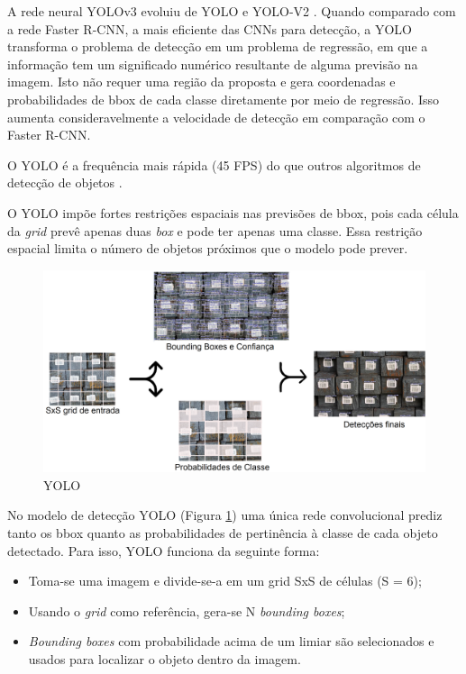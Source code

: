 A rede neural YOLOv3 evoluiu de YOLO e YOLO-V2 \cite{redmon2018yolov3}. Quando comparado com a rede Faster R-CNN, a mais eficiente das CNNs para detecção, a YOLO transforma o problema de detecção em um problema de regressão, em que a informação tem um significado numérico resultante de alguma previsão na imagem. Isto não requer uma região da proposta e gera coordenadas e probabilidades de bbox de cada classe diretamente por meio de regressão. Isso aumenta consideravelmente a velocidade de detecção em comparação com o Faster R-CNN.\cite{yolov3_apple}

O YOLO é a frequência mais rápida (45 FPS) do que outros algoritmos de detecção de objetos \cite{yolov3RealTime}.

O YOLO impõe fortes restrições espaciais nas previsões de bbox, pois cada célula da \textit{grid} prevê apenas duas \textit{box} e pode ter apenas uma classe. Essa restrição espacial limita o número de objetos próximos que o modelo pode prever. \cite{yolov3RealTime}

\begin{figure}[htbp]
		\centering
		\includegraphics[scale=0.2]{figuras/MachineLearning/yolo.png}
		\caption{YOLO}
		\label{fig:yolo}
\end{figure}

No modelo de detecção YOLO (Figura \ref{fig:yolo}) uma única rede convolucional prediz tanto os bbox quanto as probabilidades de pertinência à classe de cada objeto detectado. Para isso, YOLO funciona da seguinte forma:

\begin{itemize}
    \item Toma-se uma imagem e divide-se-a em um grid SxS de células (S = 6);
    \item Usando o \textit{grid} como referência, gera-se N \textit{bounding boxes};
    \item \textit{Bounding boxes} com probabilidade acima de um limiar são selecionados e usados para localizar o objeto dentro da imagem.
\end{itemize}

